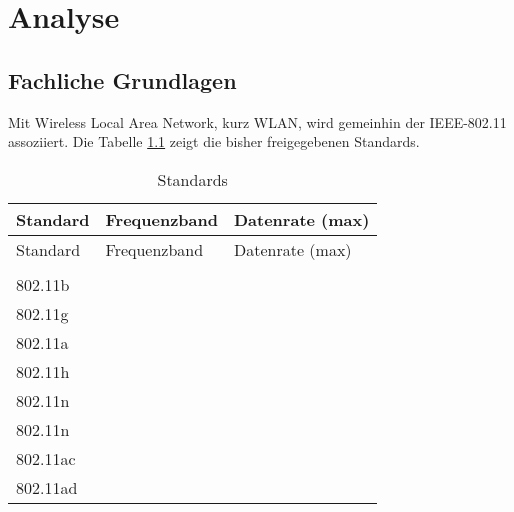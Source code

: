 \documentclass[oneside,11pt,parskip=half,ngerman]{scrreprt}
\begin{document}
\chapter{Analyse}\label{analyse}

\section{Fachliche Grundlagen}\label{fachliche-grundlagen}

Mit Wireless Local Area Network, kurz WLAN, wird gemeinhin der
IEEE-802.11 assoziiert. Die Tabelle \ref{standards} zeigt die bisher
freigegebenen Standards.

\begin{longtable}[c]{@{}lll@{}}
\caption{Standards \label{standards}\\}\tabularnewline
\toprule
\begin{minipage}[b]{0.15\columnwidth}\raggedright\strut
Standard
\strut\end{minipage} &
\begin{minipage}[b]{0.20\columnwidth}\raggedright\strut
Frequenzband
\strut\end{minipage} &
\begin{minipage}[b]{0.24\columnwidth}\raggedright\strut
Datenrate (max)
\strut\end{minipage}\tabularnewline
\midrule
\endfirsthead
\toprule
\begin{minipage}[b]{0.15\columnwidth}\raggedright\strut
Standard
\strut\end{minipage} &
\begin{minipage}[b]{0.20\columnwidth}\raggedright\strut
Frequenzband
\strut\end{minipage} &
\begin{minipage}[b]{0.24\columnwidth}\raggedright\strut
Datenrate (max)
\strut\end{minipage}\tabularnewline
\midrule
\endhead
\begin{minipage}[t]{0.15\columnwidth}\raggedright\strut
802.11\\802.11b\\802.11g\\802.11a\\802.11h\\802.11n\\802.11n\\802.11ac\\802.11ad
\strut\end{minipage} &
\begin{minipage}[t]{0.20\columnwidth}\raggedright\strut

\end{minipage}
\end{longtable}
\end{document}
